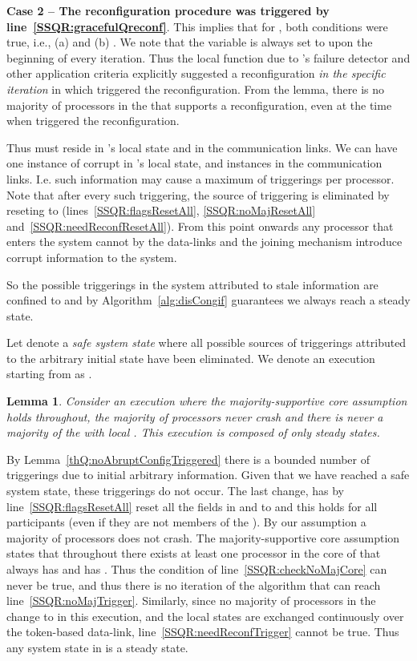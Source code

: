 \documentclass[11pt]{article}
\newcommand{\assert}{lemma}
\newtheorem{lemma}[theorem]{Lemma}
\newenvironment{proof}{\noindent{\bf Proof.}}{\hfill}
\begin{document}
\begin{proof}
\noindent \textbf{Case 2 -- The reconfiguration procedure was triggered by line~\ref{SSQR:gracefulQreconf}}.
This implies that for , both conditions were true, i.e., (a)  and (b) .
We note that the  variable is always set to  upon the beginning of every iteration.
Thus the local function  due to 's failure detector and other application criteria explicitly suggested a reconfiguration \emph{in the specific iteration} in which  triggered the reconfiguration.
From the \assert, there is no majority of processors in the  that supports a reconfiguration, even at the time when  triggered the reconfiguration.


Thus  must reside in 's local state and in the communication links. 
We can have one instance of corrupt  in 's local state, and  instances in the communication links.
I.e. such information may cause a maximum of  triggerings per processor.
Note that after every such triggering, the source of triggering is eliminated by reseting  to  (lines~\ref{SSQR:flagsResetAll}, \ref{SSQR:noMajResetAll} and~\ref{SSQR:needReconfResetAll}).
From this point onwards any processor that enters the system cannot by the data-links and the joining mechanism introduce corrupt information to the system.

So the possible triggerings in the system attributed to stale information are confined to  and by Algorithm~\ref{alg:disCongif} guarantees we always reach a steady  state.
\end{proof}

\vspace{.5em}
Let  denote a \emph{safe system state} where all possible sources of triggerings  attributed to the arbitrary initial state have been eliminated.
We denote an execution starting from  as .

\begin{lemma}
\label{thQ:steadyRemainsSteady}
Consider an execution  where the majority-supportive core assumption holds throughout, the majority of  processors never crash and there is never a majority of the  with local . 
This execution is composed of only steady  states. 
\end{lemma}

\begin{proof}
By Lemma~\ref{thQ:noAbruptConfigTriggered} there is a bounded number of triggerings due to initial arbitrary information.
Given that we have reached a safe system state, these triggerings do not occur.
The last  change, has by line~\ref{SSQR:flagsResetAll} reset all the fields in  and  to  and this holds for all participants (even if they are not members of the ).
By our assumption a majority of processors does not crash. 
The majority-supportive core assumption states that throughout  there exists at least one processor  in the core of  that always has  and  has  .
Thus the condition of line~\ref{SSQR:checkNoMajCore} can never be true, and thus there is no iteration of the algorithm that can reach line~\ref{SSQR:noMajTrigger}.
Similarly, since no majority of processors in the  change to  in this execution, and the local states are exchanged continuously over the token-based data-link, line~\ref{SSQR:needReconfTrigger} cannot be true.
Thus any system state in  is a steady  state.
\end{proof}
\end{document}
